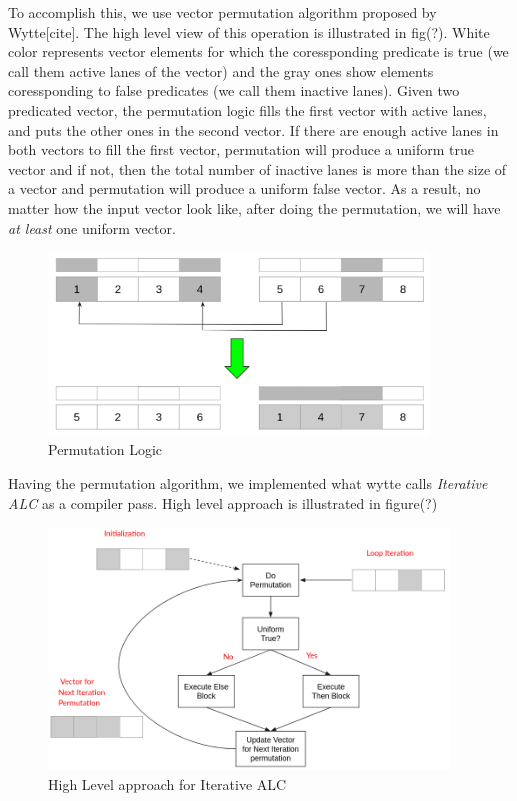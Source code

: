 \documentclass[\main/thesis.tex]{subfiles}
\begin{document}
To accomplish this, we use vector permutation algorithm proposed by Wytte[cite]. The high level view of this operation is illustrated in fig(?). White color represents vector elements for which the coressponding predicate is true (we call them active lanes of the vector) and the gray ones show elements coressponding to false predicates (we call them inactive lanes).
Given two predicated vector, the permutation logic fills the first vector with active lanes, and puts the other ones in the second vector. If there are enough active lanes in both vectors to fill the first vector, permutation will produce a uniform true vector and if not, then the total number of inactive lanes is more than the size of a vector and permutation will produce
a uniform false vector. As a result, no matter how the input vector look like, after doing the permutation, we will have \emph{at least} one uniform vector.

\begin{figure}[t!]
    \centering
    \includegraphics[width=0.90\textwidth]{img/permutation.png}
    \caption{Permutation Logic}
    \label{fig:permutation}
\end{figure}

Having the permutation algorithm, we implemented what wytte calls \emph{Iterative ALC} as a compiler pass. High level approach is illustrated in figure(?)

\begin{figure}[t!]
    \centering
    \includegraphics[width=0.95\textwidth]{img/iterative_alc.png}
    \caption{High Level approach for Iterative ALC}
    \label{fig:iterative_alc}
\end{figure}
\end{document}
